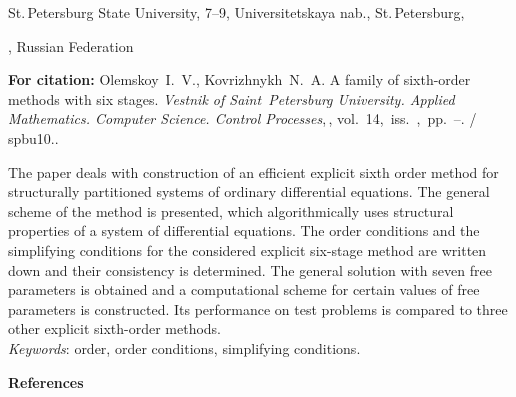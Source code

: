 
{\normalsize

\vskip 6mm


}

\vskip 2mm

{\small


\vskip 2mm

{\footnotesize \noindent%
St.\,Petersburg State University,
7--9, Universitetskaya nab., St.\,Petersburg,

, Russian Federation

%

}

\vskip3mm

\noindent \textbf{For citation:}  Olemskoy~I.~V.,
Kovrizhnykh~N.~A. A family of sixth-order methods with six stages.
{\it Vestnik of Saint~Petersburg University. Applied Mathematics.
Computer Science. Control Processes},\,\issueyear,
vol.~14,~iss.~\issuenum,~pp.~\pageref{p3}--\pageref{p3e}.
\doivyp/\enskip%
\!\!\!spbu10.\issueyear.

\vskip3mm

{\leftskip=7mm\noindent The paper deals with construction of an
efficient explicit sixth order method for structurally partitioned
systems of ordinary differential equations. The general scheme of
the method is presented, which algorithmically uses structural
properties of a system of differential equations. The order
conditions and the simplifying conditions for the considered
explicit six-stage method are written down and their consistency
is determined. The general solution with seven free parameters is
obtained and a computational scheme for certain values of free
parameters is constructed. Its performance on test
problems is compared to three other explicit sixth-order methods.\\[1mm]
\textit{Keywords}: order,  order conditions, simplifying
conditions.
\par}

\vskip5mm

\noindent \textbf{References} }

\vskip 2mm

